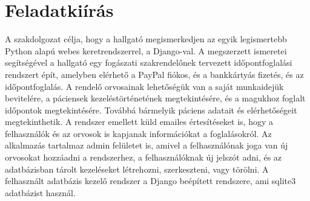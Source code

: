 \chapter*{Feladatkiírás}
A szakdolgozat célja, hogy a hallgató megismerkedjen az egyik legismertebb Python alapú webes keretrendszerrel, a Django-val. A megszerzett ismeretei segítségével a hallgató egy fogászati szakrendelőnek tervezett időpontfoglalási rendszert épít, amelyben elérhető a PayPal fiókos, és a bankkártyás fizetés, és az időpontfoglalás. A rendelő orvosainak lehetőségük van a saját munkaidejük bevitelére, a páciensek kezeléstörténetének megtekintésére, és a magukhoz foglalt időpontok megtekintésére. Továbbá bármelyik páciens adatait és elérhetőségeit megtekinthetik. A rendszer emellett küld emailes értesítéseket is, hogy a felhasználók és az orvosok is kapjanak információkat a foglalásokról. Az alkalmazás tartalmaz admin felületet is, amivel a felhasználónak joga van új orvosokat hozzáadni a rendszerhez, a felhasználóknak új jelszót adni, és az adatbázisban tárolt kezeléseket létrehozni, szerkeszteni, vagy törölni. A felhasznált adatbázis kezelő rendszer a Django beépített rendszere, ami sqlite3 adatbázist használ.
